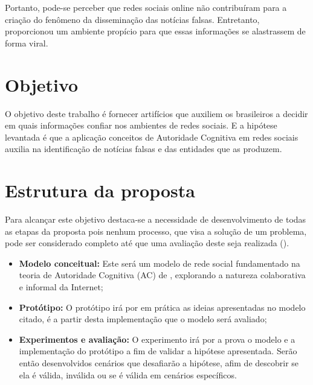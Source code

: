 Portanto, pode-se perceber que redes sociais online não contribuíram para a criação do fenômeno da disseminação das notícias falsas. Entretanto, proporcionou um ambiente propício para que essas informações se alastrassem de forma viral. 

\section{Objetivo}

O objetivo deste trabalho é fornecer artifícios que auxiliem os brasileiros a decidir em quais informações confiar nos ambientes de redes sociais. E a hipótese levantada é que a aplicação conceitos de Autoridade Cognitiva em redes sociais auxilia na identificação de notícias falsas e das entidades que as produzem. 

\section{Estrutura da proposta}

Para alcançar este objetivo destaca-se a necessidade de desenvolvimento de todas as etapas da proposta pois nenhum processo, que visa a solução de um problema, pode ser considerado completo até que uma avaliação deste seja realizada (\cite{jayaratna_understanding_1994}).

\begin{itemize}
    \item \textbf{Modelo conceitual:} Este será um modelo de rede social fundamentado na teoria de Autoridade Cognitiva (AC) de \cite{Wilson1983}, explorando a natureza colaborativa e informal da Internet;
    \item \textbf{Protótipo:} O protótipo irá por em prática as ideias apresentadas no modelo citado, é a partir desta implementação que o modelo será avaliado;
    \item \textbf{Experimentos e avaliação:} O experimento irá por a prova o modelo e a implementação do protótipo a fim de validar a hipótese apresentada. Serão então desenvolvidos cenários que desafiarão a hipótese, afim de descobrir se ela é válida, inválida ou se é válida em cenários específicos.
\end{itemize}






